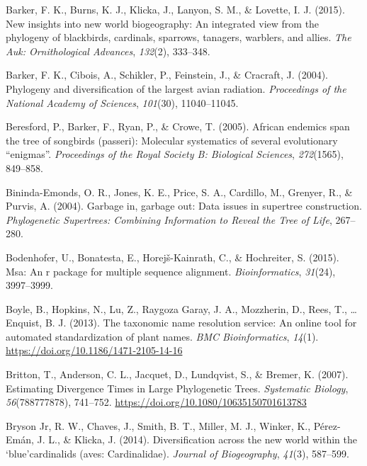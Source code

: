 \documentclass[english,man]{apa6}
\begin{document}
\leavevmode\hypertarget{ref-barker2015new}{}%
Barker, F. K., Burns, K. J., Klicka, J., Lanyon, S. M., \& Lovette, I. J. (2015). New insights into new world biogeography: An integrated view from the phylogeny of blackbirds, cardinals, sparrows, tanagers, warblers, and allies. \emph{The Auk: Ornithological Advances}, \emph{132}(2), 333--348.

\leavevmode\hypertarget{ref-barker2004phylogeny}{}%
Barker, F. K., Cibois, A., Schikler, P., Feinstein, J., \& Cracraft, J. (2004). Phylogeny and diversification of the largest avian radiation. \emph{Proceedings of the National Academy of Sciences}, \emph{101}(30), 11040--11045.

\leavevmode\hypertarget{ref-beresford2005african}{}%
Beresford, P., Barker, F., Ryan, P., \& Crowe, T. (2005). African endemics span the tree of songbirds (passeri): Molecular systematics of several evolutionary ``enigmas''. \emph{Proceedings of the Royal Society B: Biological Sciences}, \emph{272}(1565), 849--858.

\leavevmode\hypertarget{ref-bininda2004garbage}{}%
Bininda-Emonds, O. R., Jones, K. E., Price, S. A., Cardillo, M., Grenyer, R., \& Purvis, A. (2004). Garbage in, garbage out: Data issues in supertree construction. \emph{Phylogenetic Supertrees: Combining Information to Reveal the Tree of Life}, 267--280.

\leavevmode\hypertarget{ref-bodenhofer2015msa}{}%
Bodenhofer, U., Bonatesta, E., Horejš-Kainrath, C., \& Hochreiter, S. (2015). Msa: An r package for multiple sequence alignment. \emph{Bioinformatics}, \emph{31}(24), 3997--3999.

\leavevmode\hypertarget{ref-Boyle2013}{}%
Boyle, B., Hopkins, N., Lu, Z., Raygoza Garay, J. A., Mozzherin, D., Rees, T., \ldots{} Enquist, B. J. (2013). The taxonomic name resolution service: An online tool for automated standardization of plant names. \emph{BMC Bioinformatics}, \emph{14}(1). \url{https://doi.org/10.1186/1471-2105-14-16}

\leavevmode\hypertarget{ref-Britton2007}{}%
Britton, T., Anderson, C. L., Jacquet, D., Lundqvist, S., \& Bremer, K. (2007). Estimating Divergence Times in Large Phylogenetic Trees. \emph{Systematic Biology}, \emph{56}(788777878), 741--752. \url{https://doi.org/10.1080/10635150701613783}

\leavevmode\hypertarget{ref-bryson2014diversification}{}%
Bryson Jr, R. W., Chaves, J., Smith, B. T., Miller, M. J., Winker, K., Pérez-Emán, J. L., \& Klicka, J. (2014). Diversification across the new world within the `blue'cardinalids (aves: Cardinalidae). \emph{Journal of Biogeography}, \emph{41}(3), 587--599.
\end{document}
